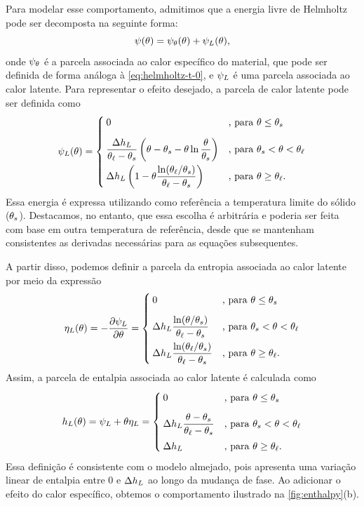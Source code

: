 \documentclass[Tese.tex]{subfiles}
\begin{document}
Para modelar esse comportamento, admitimos que a energia livre de Helmholtz pode ser decomposta na seguinte forma:
\begin{equation}
\psi(\theta) = \psi_{\theta}(\theta) + \psi_L(\theta),
\end{equation}
onde $\psi_{\theta}$ é a parcela associada ao calor específico do material, que pode ser definida de forma análoga à \cref{eq:helmholtz-t-0}, e $\psi_L$ é uma parcela associada ao calor latente. Para representar o efeito desejado, a parcela de calor latente pode ser definida como
\begin{equation}\label{eq:helmholtzL}
\psi_L(\theta) = 
\begin{cases}
0 			&\text{, para }\theta \leq \theta_s\\[0.3cm]
\dfrac{\Delta h_L}{\theta_\ell-\theta_s}\left(\theta - \theta_s - \theta\ln\dfrac{\theta}{\theta_s}\right)&\text{, para }\theta_s < \theta < \theta_\ell \\[0.3cm]
\Delta h_L\left(1 - \theta\dfrac{\ln(\theta_\ell/\theta_s)}{\theta_\ell-\theta_s}\right)			&\text{, para }\theta \geq \theta_\ell.
\end{cases}
\end{equation}
Essa energia é expressa utilizando como referência a temperatura limite do sólido ($\theta_s$). Destacamos, no entanto, que essa escolha é arbitrária e poderia ser feita com base em outra temperatura de referência, desde que se mantenham consistentes as derivadas necessárias para as equações subsequentes.

A partir disso, podemos definir a parcela da entropia associada ao calor latente por meio da expressão
\begin{equation}
\eta_L(\theta) = -\dfrac{\partial\psi_L}{\partial\theta} = 
\begin{cases}
0 			&\text{, para }\theta \leq \theta_s\\[0.3cm]
\Delta h_L\dfrac{\ln(\theta/\theta_s)}{\theta_\ell-\theta_s} &\text{, para }\theta_s < \theta < \theta_\ell \\[0.3cm]
\Delta h_L\dfrac{\ln(\theta_\ell/\theta_s)}{\theta_\ell-\theta_s}			&\text{, para }\theta \geq \theta_\ell.
\end{cases}
\end{equation}
Assim, a parcela de entalpia associada ao calor latente é calculada como
\begin{equation}\label{eq:enthalpyL}
h_L(\theta) = \psi_L + \theta\eta_L = 
\begin{cases}
0 			&\text{, para }\theta \leq \theta_s\\[0.3cm]
\Delta h_L\dfrac{\theta - \theta_s}{\theta_\ell-\theta_s} &\text{, para }\theta_s < \theta < \theta_\ell \\[0.3cm]
\Delta h_L			&\text{, para }\theta \geq \theta_\ell.
\end{cases}
\end{equation}
Essa definição é consistente com o modelo almejado, pois apresenta uma variação linear de entalpia entre $0$ e $\Delta h_L$ ao longo da mudança de fase. Ao adicionar o efeito do calor específico, obtemos o comportamento ilustrado na \cref{fig:enthalpy}(b).
\end{document}
